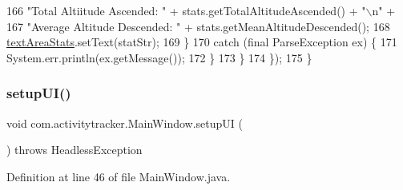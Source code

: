 \begin{DoxyCode}
166                             \textcolor{stringliteral}{"Total Altiitude Ascended: "} + stats.getTotalAltitudeAscended() + \textcolor{stringliteral}{"\(\backslash\)n"} +
167                             \textcolor{stringliteral}{"Average Altitude Descended: "} + stats.getMeanAltitudeDescended();
168                     \mbox{\hyperlink{classcom_1_1activitytracker_1_1_main_window_ac8e2aa82f079b11dbdc5bcf2e81d2324}{textAreaStats}}.setText(statStr);
169                 \}
170                 \textcolor{keywordflow}{catch} (\textcolor{keyword}{final} ParseException ex) \{
171                     System.err.println(ex.getMessage());
172                 \}
173             \}
174         \});
175     \}
\end{DoxyCode}
\mbox{\label{classcom_1_1activitytracker_1_1_main_window_a53a019623a37b950473359fc625b6423}} 
\subsubsection{\texorpdfstring{setup\+U\+I()}{setupUI()}}
{\footnotesize\ttfamily void com.\+activitytracker.\+Main\+Window.\+setup\+UI (\begin{DoxyParamCaption}{ }\end{DoxyParamCaption}) throws Headless\+Exception\hspace{0.3cm}{\ttfamily [private]}}



Definition at line 46 of file Main\+Window.\+java.


